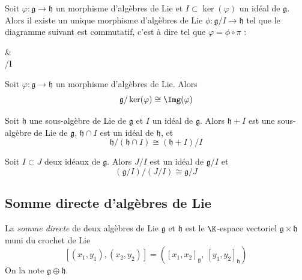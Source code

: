 \begin{theorem}
    Soit $\varphi : \mathfrak{g} \to \mathfrak{h}$ un morphisme d'algèbres de Lie et $I \subset \ker(\varphi)$ un idéal de $\mathfrak{g}$. Alors il existe un unique morphisme d'algèbres de Lie $\phi : \mathfrak{g}/I \to \mathfrak{h}$ tel que le diagramme suivant est commutatif, c'est à dire tel que $\varphi = \phi \circ \pi$ :
    \begin{diag}
         \arrow[r, "\varphi"] \arrow[d, epi, "\pi"'] &  \\
        /I 
    \end{diag}
\end{theorem}

\omitted

\begin{corollary}
    Soit $\varphi : \mathfrak{g} \to \mathfrak{h}$ un morphisme d'algèbres de Lie. Alors
    $$\mathfrak{g}/\ker(\varphi) \cong \Img(\varphi)$$
\end{corollary}

\omitted

\begin{theorem}
    Soit $\mathfrak{h}$ une sous-algèbre de Lie de $\mathfrak{g}$ et $I$ un idéal de $\mathfrak{g}$. Alors $\mathfrak{h} + I$ est une sous-algèbre de Lie de $\mathfrak{g}$, $\mathfrak{h} \cap I$ est un idéal de $\mathfrak{h}$, et
    $$\mathfrak{h}/(\mathfrak{h} \cap I) \cong (\mathfrak{h} + I)/I$$
\end{theorem}

\omitted

\begin{theorem}
    Soit $I \subset J$ deux idéaux de $\mathfrak{g}$. Alors $J/I$ est un idéal de $\mathfrak{g}/I$ et
    $$(\mathfrak{g}/I)/(J/I) \cong \mathfrak{g}/J$$
\end{theorem}

\omitted

\subsection{Somme directe d'algèbres de Lie}

\begin{definition}
    La \emph{somme directe} de deux algèbres de Lie $\mathfrak{g}$ et $\mathfrak{h}$ est le $\K$-espace vectoriel $\mathfrak{g} \times \mathfrak{h}$ muni du crochet de Lie
    $$[(x_1, y_1), (x_2, y_2)] = ([x_1, x_2]_{\mathfrak{g}},\ [y_1, y_2]_{\mathfrak{h}})$$
    On la note $\mathfrak{g} \oplus \mathfrak{h}$.
\end{definition}

